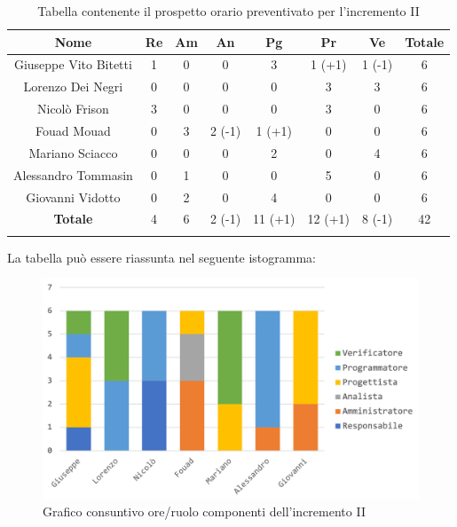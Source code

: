 			\begin{longtable}{|c|c|c|c|c|c|c|c}
				\hline
				\rowcolor{lighter-grayer}
				\textbf{Nome} & \textbf{Re} & \textbf{Am} & \textbf{An} & \textbf{Pg}  & \textbf{Pr}   & \textbf{Ve} & \textbf{Totale} \\
				\hline
				\endfirsthead
				\hline
				Giuseppe Vito Bitetti  & 1 & 0 & 0 & 3 & 1 (+1) & 1 (-1) & 6\\
				\hline
				\hline
				Lorenzo Dei Negri      & 0 & 0 & 0 & 0 & 3 & 3 & 6 \\
				\hline
				\hline
				Nicolò Frison 			  & 3 & 0 & 0 & 0 & 3 & 0 & 6 \\
				\hline
				\hline
				Fouad Mouad 			& 0 & 3 & 2 (-1) & 1 (+1) & 0 & 0 & 6 \\
				\hline
				\hline
				Mariano Sciacco			 & 0 & 0 & 0 & 2 & 0 & 4 & 6 \\
				\hline
				\hline
				Alessandro Tommasin & 0 & 1 & 0 & 0 & 5 & 0 & 6 \\
				\hline
				\hline
				Giovanni Vidotto 		& 0 & 2 & 0 & 4 & 0 & 0 & 6\\
				\hline 
				\textbf{Totale} 		   & 4 &  6 & 2 (-1) & 11 (+1) & 12 (+1) & 8 (-1) & 42\\
				\hline 
				
				\caption{Tabella contenente il prospetto orario preventivato per l'incremento II}
			\end{longtable}
			
			La tabella può essere riassunta nel seguente istogramma:
			
			\begin{figure}[H]
				\centering
				\includegraphics[width=0.8\linewidth]{images/consuntivo/ConsIncr2-1.png}
				\caption{Grafico consuntivo ore/ruolo componenti dell'incremento II}
				\label{fig:consuntivo grafico suddivione ruoli incremento II}
			\end{figure}
			\pagebreak
			
